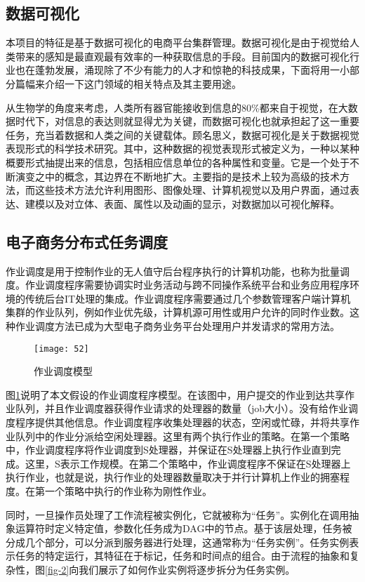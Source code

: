 \subsection{数据可视化}
本项目的特征是基于数据可视化的电商平台集群管理。数据可视化是由于视觉给人类带来的感知是最直观最有效率的一种获取信息的手段。目前国内的数据可视化行业也在蓬勃发展，涌现除了不少有能力的人才和惊艳的科技成果，下面将用一小部分篇幅来介绍一下这门领域的相关特点及其主要用途。

从生物学的角度来考虑，人类所有器官能接收到信息的80\%都来自于视觉，在大数据时代下，对信息的表达则就显得尤为关键，而数据可视化也就承担起了这一重要任务，充当着数据和人类之间的关键载体。顾名思义，数据可视化是关于数据视觉表现形式的科学技术研究。其中，这种数据的视觉表现形式被定义为，一种以某种概要形式抽提出来的信息，包括相应信息单位的各种属性和变量。它是一个处于不断演变之中的概念，其边界在不断地扩大。主要指的是技术上较为高级的技术方法，而这些技术方法允许利用图形、图像处理、计算机视觉以及用户界面，通过表达、建模以及对立体、表面、属性以及动画的显示，对数据加以可视化解释。
\subsection{电子商务分布式任务调度}
作业调度是用于控制作业的无人值守后台程序执行的计算机功能，也称为批量调度。作业调度程序需要协调实时业务活动与跨不同操作系统平台和业务应用程序环境的传统后台IT处理的集成。作业调度程序需要通过几个参数管理客户端计算机集群的作业队列，例如作业优先级，计算机源可用性或用户允许的同时作业数。这种作业调度方法已成为大型电子商务业务平台处理用户并发请求的常用方法。

\begin{figure}
	\centering
	\texttt{[image: 52]}
	\caption{作业调度模型}
	\label{fig-1}
\end{figure}

图\ref{fig-1}说明了本文假设的作业调度程序模型。在该图中，用户提交的作业到达共享作业队列，并且作业调度器获得作业请求的处理器的数量（job大小）。没有给作业调度程序提供其他信息。作业调度程序收集处理器的状态，空闲或忙碌，并将共享作业队列中的作业分派给空闲处理器。这里有两个执行作业的策略。在第一个策略中，作业调度程序将作业调度到S处理器，并保证在S处理器上执行作业直到完成。这里，S表示工作规模。在第二个策略中，作业调度程序不保证在S处理器上执行作业，也就是说，执行作业的处理器数量取决于并行计算机上作业的拥塞程度。在第一个策略中执行的作业称为刚性作业。

同时，一旦操作员处理了工作流程被实例化，它就被称为“任务”。实例化在调用抽象运算符时定义特定值，参数化任务成为DAG中的节点。基于该层处理，任务被分成几个部分，可以分派到服务器进行处理，这通常称为“任务实例”。任务实例表示任务的特定运行，其特征在于标记，任务和时间点的组合。由于流程的抽象和复杂性，图\ref{fig-2}向我们展示了如何作业实例将逐步拆分为任务实例。

